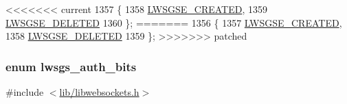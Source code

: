 \begin{DoxyCode}
<<<<<<< current
1357                   \{
1358         \hyperlink{group__generic-sessions_ggaa93946b3d921072209d5cd8cdfa5332ea596010a165bf13473c5eea3a34cd4308}{LWSGSE\_CREATED}, 
1359         \hyperlink{group__generic-sessions_ggaa93946b3d921072209d5cd8cdfa5332ead908cdc5689c5d22c9d3c8934e94dcde}{LWSGSE\_DELETED}  
1360 \};
=======
1356                   \{
1357         \hyperlink{group__generic-sessions_ggaa93946b3d921072209d5cd8cdfa5332ea596010a165bf13473c5eea3a34cd4308}{LWSGSE\_CREATED}, 
1358         \hyperlink{group__generic-sessions_ggaa93946b3d921072209d5cd8cdfa5332ead908cdc5689c5d22c9d3c8934e94dcde}{LWSGSE\_DELETED}  
1359 \};
>>>>>>> patched
\end{DoxyCode}
\subsubsection[{\texorpdfstring{lwsgs\+\_\+auth\+\_\+bits}{lwsgs\_auth\_bits}}]{\setlength{\rightskip}{0pt plus 5cm}enum {\bf lwsgs\+\_\+auth\+\_\+bits}}\hypertarget{group__generic-sessions_ga7c2dc7bfb4ccb91c5d771f9e9ea237e1}{}\label{group__generic-sessions_ga7c2dc7bfb4ccb91c5d771f9e9ea237e1}


{\ttfamily \#include $<$\hyperlink{libwebsockets_8h}{lib/libwebsockets.\+h}$>$}

